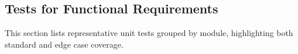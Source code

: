 \documentclass[12pt, titlepage]{article}
\begin{document}




\subsection{Tests for Functional Requirements}
This section lists representative unit tests grouped by module, highlighting both standard and edge case coverage.
\end{document}
